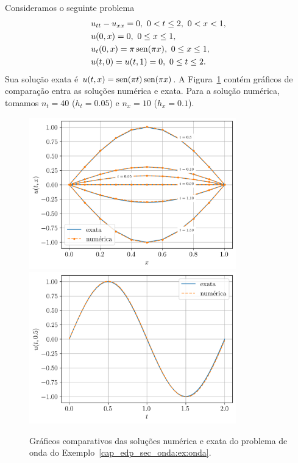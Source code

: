 \begin{ex}\label{cap_edp_sec_onda:ex:onda}
  Consideramos o seguinte problema
  \begin{subequations}
    \begin{align}
      &u_{tt} - u_{xx} = 0, ~0 < t \leq 2, ~0< x < 1,\\
      &u(0,x) = 0, ~0\leq x \leq 1,\\
      &u_t(0,x) = \pi\operatorname{sen}(\pi x), ~0\leq x \leq 1,\\
      &u(t,0) = u(t,1) = 0, ~0\leq t \leq 2.
    \end{align}
  \end{subequations}
  Sua solução exata é $u(t,x) = \operatorname{sen}(\pi t)\operatorname{sen}(\pi x)$. A Figura~\ref{cap_edp_sec_onda:fig:ex} contém gráficos de comparação entra as soluções numérica e exata. Para a solução numérica, tomamos $n_t = 40$ ($h_t=0.05$) e $n_x = 10$ ($h_x = 0.1$).

\begin{figure}[H]
  \centering
  \includegraphics[width=0.8\textwidth]{./cap_edp/dados/fig_ex_onda/fig_xx}\\
  \includegraphics[width=0.8\textwidth]{./cap_edp/dados/fig_ex_onda/fig_x05}\\
  \caption{Gráficos comparativos das soluções numérica e exata do problema de onda do Exemplo~\ref{cap_edp_sec_onda:ex:onda}.}
  \label{cap_edp_sec_onda:fig:ex}
\end{figure}


\end{ex}

